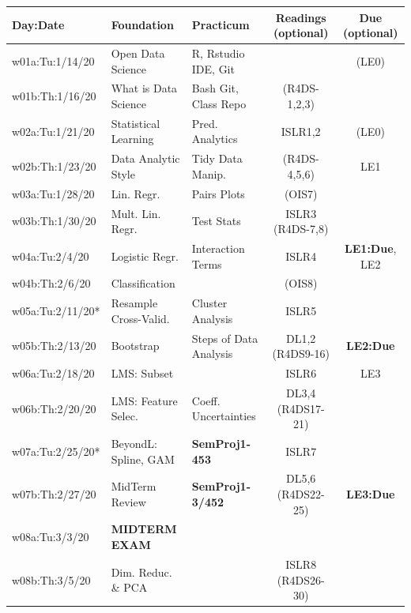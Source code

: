 \documentclass[11pt]{article} %
\begin{document}
  \begin{table}[h] 
  	\centering %
  	\begin{tabular}{| l | p{4cm} | p{4cm} | c | c |} %
  	\hline %
  	Day:Date & Foundation & Practicum  & Readings (optional) & Due (optional)  \\ %
  	\hline 
  	\hline %
    w01a:Tu:1/14/20 & Open Data Science & R, Rstudio IDE, Git &  & (LE0) \\ %
    \hline %
    w01b:Th:1/16/20 & What is Data Science & Bash Git, Class Repo & (R4DS-1,2,3) & \\ 
    \hline  
    \hline
     w02a:Tu:1/21/20 & Statistical Learning & Pred. Analytics & ISLR1,2 & (LE0) \\ 
    \hline
    w02b:Th:1/23/20 &  Data Analytic Style & Tidy Data Manip. & (R4DS-4,5,6) & LE1 \\
    \hline 
    \hline
    w03a:Tu:1/28/20 & Lin. Regr. & Pairs Plots & (OIS7) &  \\ 
    \hline
    w03b:Th:1/30/20 & Mult. Lin. Regr. & Test Stats & ISLR3 (R4DS-7,8) & \\
    \hline
    \hline 
    w04a:Tu:2/4/20 & Logistic Regr. & Interaction Terms & ISLR4 & {\bf LE1:Due}, LE2\\ 
    \hline
    w04b:Th:2/6/20 & Classification & & (OIS8) & \\
    \hline
    \hline 
    w05a:Tu:2/11/20* & Resample Cross-Valid. & Cluster Analysis & ISLR5 &  \\ 
    \hline
    w05b:Th:2/13/20 & Bootstrap & Steps of Data Analysis & DL1,2 (R4DS9-16) & {\bf LE2:Due} \\
    \hline
    \hline 
    w06a:Tu:2/18/20 & LMS: Subset &  & ISLR6 & LE3 \\ 
    \hline
    w06b:Th:2/20/20 & LMS: Feature Selec. & Coeff. Uncertainties & DL3,4 (R4DS17-21) &  \\
    \hline
    \hline 
    w07a:Tu:2/25/20* & BeyondL: Spline, GAM & {\bf SemProj1-453} & ISLR7 &  \\ 
    \hline
    w07b:Th:2/27/20 & MidTerm Review & {\bf SemProj1-3/452} & DL5,6 (R4DS22-25) & {\bf LE3:Due} \\
    \hline
    \hline 
    w08a:Tu:3/3/20 & {\bf MIDTERM EXAM} &  &  &  \\ 
    \hline
    w08b:Th:3/5/20 & Dim. Reduc. \& PCA &  & ISLR8 (R4DS26-30) & \\

\end{tabular}
\end{table}
\end{document}
